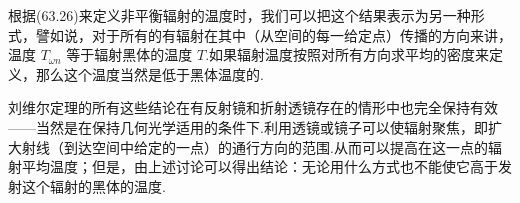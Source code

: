 根据(63.26)来定义非平衡辐射的温度时，我们可以把这个结果表示为另一种形式，譬如说，对于所有的有辐射在其中（从空间的每一给定点）传播的方向来讲，温度 $T_{\omega n}$ 等于辐射黑体的温度 $T$.如果辐射温度按照对所有方向求平均的密度来定义，那么这个温度当然是低于黑体温度的.

刘维尔定理的所有这些结论在有反射镜和折射透镜存在的情形中也完全保持有效——当然是在保持几何光学适用的条件下.利用透镜或镜子可以使辐射聚焦，即扩大射线（到达空间中给定的一点）的通行方向的范围.从而可以提高在这一点的辐射平均温度；但是，由上述讨论可以得出结论：无论用什么方式也不能使它高于发射这个辐射的黑体的温度.
